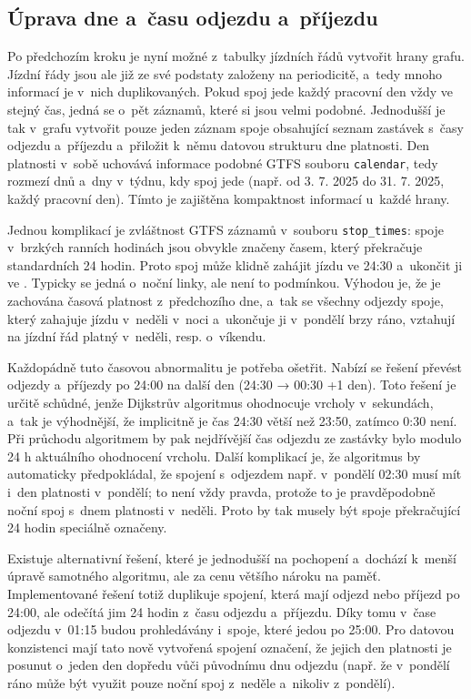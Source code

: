 \subsection{Úprava dne a~času odjezdu a~příjezdu}
Po předchozím kroku je nyní možné z~tabulky jízdních řádů vytvořit hrany grafu. Jízdní řády jsou ale již ze své podstaty založeny na periodicitě, a~tedy mnoho informací je v~nich duplikovaných. Pokud spoj jede každý pracovní den vždy ve stejný čas, jedná se o~pět záznamů, které si jsou velmi podobné. Jednodušší je tak v~grafu vytvořit pouze jeden záznam spoje obsahující seznam zastávek s~časy odjezdu a~příjezdu a~přiložit k~němu datovou strukturu dne platnosti. Den platnosti v~sobě uchovává informace podobné GTFS souboru \texttt{calendar}, tedy rozmezí dnů a~dny v~týdnu, kdy spoj jede (např. od 3. 7. 2025 do 31. 7. 2025, každý pracovní den). Tímto je zajištěna kompaktnost informací u~každé hrany.

Jednou komplikací je zvláštnost GTFS záznamů v~souboru \texttt{stop\_times}: spoje v~brzkých ranních hodinách jsou obvykle značeny časem, který překračuje standardních 24 hodin. Proto spoj může klidně zahájit jízdu ve 24:30 a~ukončit ji ve . Typicky se jedná o~noční linky, ale není to podmínkou. Výhodou je, že je zachována časová platnost z~předchozího dne, a~tak se všechny odjezdy spoje, který zahajuje jízdu v~neděli v~noci a~ukončuje ji v~pondělí brzy ráno, vztahují na jízdní řád platný v~neděli, resp. o~víkendu.

Každopádně tuto časovou abnormalitu je potřeba ošetřit. Nabízí se řešení převést odjezdy a~příjezdy po 24:00 na další den (24:30 → 00:30 +1 den). Toto řešení je určitě schůdné, jenže Dijkstrův algoritmus ohodnocuje vrcholy v~sekundách, a~tak je výhodnější, že implicitně je čas 24:30 větší než 23:50, zatímco 0:30 není. Při průchodu algoritmem by pak nejdřívější čas odjezdu ze zastávky bylo modulo 24 h aktuálního ohodnocení vrcholu. Další komplikací je, že algoritmus by automaticky předpokládal, že spojení s~odjezdem např. v~pondělí 02:30 musí mít i~den platnosti v~pondělí; to není vždy pravda, protože to je pravděpodobně noční spoj s~dnem platnosti v~neděli. Proto by tak musely být spoje překračující 24 hodin speciálně označeny. 

Existuje alternativní řešení, které je jednodušší na pochopení a~dochází k~menší úpravě samotného algoritmu, ale za cenu většího nároku na paměť. Implementované řešení totiž duplikuje spojení, která mají odjezd nebo příjezd po 24:00, ale odečítá jim 24 hodin z~času odjezdu a~příjezdu. Díky tomu v~čase odjezdu v~01:15 budou prohledávány i~spoje, které jedou po 25:00. Pro datovou konzistenci mají tato nově vytvořená spojení označení, že jejich den platnosti je posunut o~jeden den dopředu vůči původnímu dnu odjezdu (např. že v~pondělí ráno může být využit pouze noční spoj z~neděle a~nikoliv z~pondělí).

